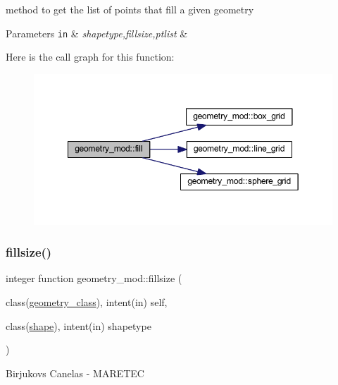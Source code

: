 method to get the list of points that fill a given geometry 
\begin{DoxyParams}[1]{Parameters}
\mbox{\tt in}  & {\em shapetype,fillsize,ptlist} & \\
\hline
\end{DoxyParams}
Here is the call graph for this function\+:
\nopagebreak
\begin{figure}[H]
\begin{center}
\leavevmode
\includegraphics[width=349pt]{namespacegeometry__mod_a095a8b47b3c23e154dcd31ab1441a065_cgraph}
\end{center}
\end{figure}
\mbox{\label{namespacegeometry__mod_a92602e1198d3607613ea2722fb002685}} 
\subsubsection{\texorpdfstring{fillsize()}{fillsize()}}
{\footnotesize\ttfamily integer function geometry\+\_\+mod\+::fillsize (\begin{DoxyParamCaption}\item[{class(\hyperlink{structgeometry__mod_1_1geometry__class}{geometry\+\_\+class}), intent(in)}]{self,  }\item[{class(\hyperlink{structgeometry__mod_1_1shape}{shape}), intent(in)}]{shapetype }\end{DoxyParamCaption})\hspace{0.3cm}{\ttfamily [private]}}



Birjukovs Canelas -\/ M\+A\+R\+E\+T\+EC 

